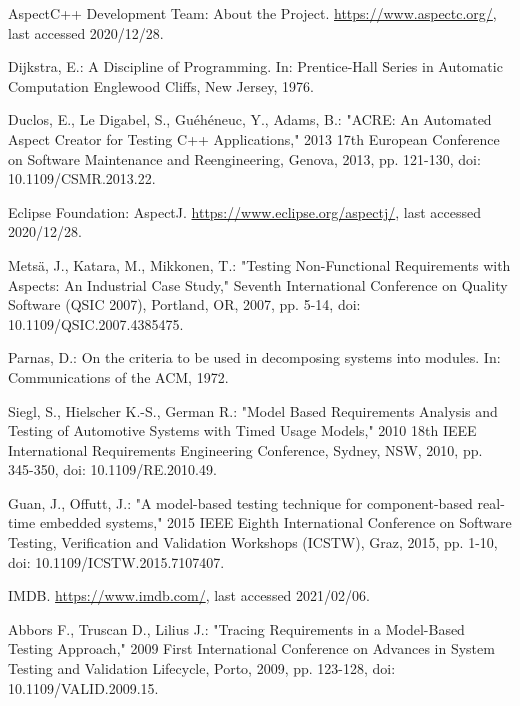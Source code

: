 \documentclass[a4paper,10pt, bibliography=totocnumbered]{scrreprt}
\begin{document}
\begin{thebibliography}{9}


 AspectC++ Development Team: About the Project.
\url{https://www.aspectc.org/}, last accessed 2020/12/28.

 Dijkstra, E.: A Discipline of Programming.
In: Prentice-Hall Series in Automatic Computation Englewood Cliffs, New Jersey, 1976.

 Duclos, E., Le Digabel, S., Guéhéneuc, Y.,  Adams, B.: "ACRE: An Automated Aspect Creator for Testing C++ Applications," 2013 17th European Conference on Software Maintenance and Reengineering, Genova, 2013, pp. 121-130, doi: 10.1109/CSMR.2013.22.

 Eclipse Foundation: AspectJ.
\url{https://www.eclipse.org/aspectj/},  last accessed 2020/12/28.

 Metsä, J., Katara, M., Mikkonen, T.: "Testing Non-Functional Requirements with Aspects: An Industrial Case Study," Seventh International Conference on Quality Software (QSIC 2007), Portland, OR, 2007, pp. 5-14, doi: 10.1109/QSIC.2007.4385475.

 Parnas, D.: On the criteria to be used in decomposing systems into modules.
In: Communications of the ACM, 1972.



 Siegl, S., Hielscher K.-S., German R.: "Model Based Requirements Analysis and Testing of Automotive Systems with Timed Usage Models," 2010 18th IEEE International Requirements Engineering Conference, Sydney, NSW, 2010, pp. 345-350, doi: 10.1109/RE.2010.49.

 Guan, J., Offutt, J.: "A model-based testing technique for component-based real-time embedded systems," 2015 IEEE Eighth International Conference on Software Testing, Verification and Validation Workshops (ICSTW), Graz, 2015, pp. 1-10, doi: 10.1109/ICSTW.2015.7107407.

 IMDB. \url{https://www.imdb.com/}, last accessed 2021/02/06.




 Abbors F., Truscan D., Lilius J.: "Tracing Requirements in a Model-Based Testing Approach," 2009 First International Conference on Advances in System Testing and Validation Lifecycle, Porto, 2009, pp. 123-128, doi: 10.1109/VALID.2009.15.


\end{thebibliography}
\end{document}
